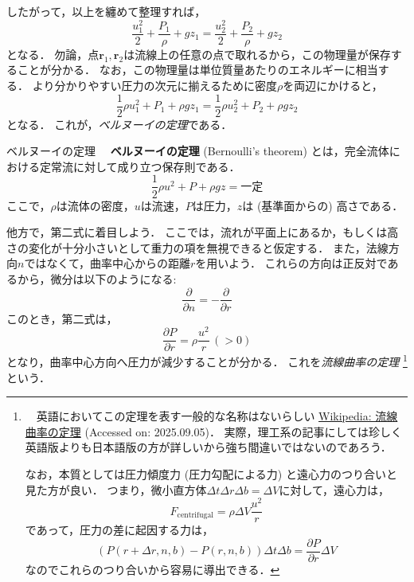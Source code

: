\documentclass[uplatex,dvipdfmx,a4j,11pt]{jsreport}
\newcommand{\keyword}[1]{\textcolor{mainblue}{\textbf{#1}}}
\numberwithin{equation}{chapter}
\begin{document}
したがって，以上を纏めて整理すれば，
\begin{equation}
  \frac{u_1^2}{2} + \frac{P_1}{\rho} + gz_1 = \frac{u_2^2}{2} + \frac{P_2}{\rho} + gz_2
\end{equation}
となる．
勿論，点$\mathbf{r}_1, \mathbf{r}_2$は流線上の任意の点で取れるから，この物理量が保存することが分かる．
なお，この物理量は単位質量あたりのエネルギーに相当する．
より分かりやすい圧力の次元に揃えるために密度$\rho$を両辺にかけると，
\begin{equation}
  \frac{1}{2}\rho u_1^2 + P_1 + \rho gz_1 = \frac{1}{2}\rho u_2^2 + P_2 + \rho gz_2 
  \label{eq:bernoulli_equation}
\end{equation}
となる．
これが，\emph{ベルヌーイの定理}である．

\begin{definition}{ベルヌーイの定理}{}{}
  　\keyword{ベルヌーイの定理} (Bernoulli's theorem) とは，完全流体における定常流に対して成り立つ保存則である．
  \begin{equation}
    \frac{1}{2}\rho u^2 + P + \rho gz = \text{一定}
  \end{equation}
  ここで，$\rho$は流体の密度，$u$は流速，$P$は圧力，$z$は (基準面からの) 高さである．
\end{definition}

他方で，第二式に着目しよう．
ここでは，流れが平面上にあるか，もしくは高さの変化が十分小さいとして重力の項を無視できると仮定する．
また，法線方向$n$ではなくて，曲率中心からの距離$r$を用いよう．
これらの方向は正反対であるから，微分は以下のようになる:
\begin{equation}
  \frac{\partial }{\partial n} = -\frac{\partial }{\partial r}
\end{equation}
このとき，第二式は，
\begin{equation*}
  \frac{\partial P}{\partial r} = \rho \frac{u^2}{r} \,(> 0)
\end{equation*}
となり，曲率中心方向へ圧力が減少することが分かる．
これを\emph{流線曲率の定理} 
\footnote{
  　英語においてこの定理を表す一般的な名称はないらしい
    \href{https://ja.wikipedia.org/wiki/\%E6\%B5\%81\%7B\%9A\%B2\%7E\%81\%AE\%5A\%E9\%A0\%9A\%7D}{Wikipedia: 流線曲率の定理} (Accessed on: 2025.09.05)．
  実際，理工系の記事にしては珍しく英語版よりも日本語版の方が詳しいから強ち間違いではないのであろう．

  なお，本質としては圧力傾度力 (圧力勾配による力) と遠心力のつり合いと見た方が良い．
  つまり，微小直方体$\Delta t \Delta r \Delta b = \Delta V$に対して，遠心力は，
  \begin{equation*}
    F_{\text{centrifugal}} = \rho \Delta V \frac{u^2}{r}
  \end{equation*}
  であって，圧力の差に起因する力は，
  \begin{equation*}
    \left(P(r + \Delta r, n, b) - P(r, n, b)\right) \Delta t \Delta b = \frac{\partial P}{\partial r} \Delta V
  \end{equation*}
  なのでこれらのつり合いから容易に導出できる．
}
という．
\end{document}
